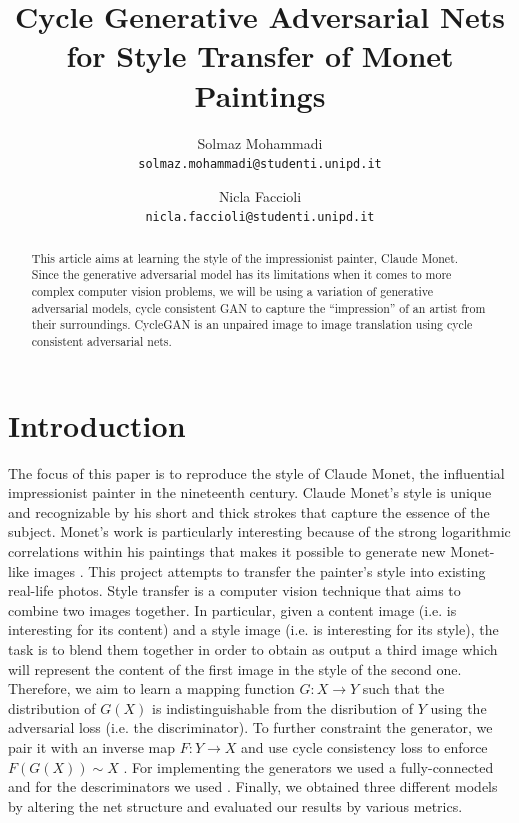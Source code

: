 \documentclass[10pt,twocolumn,letterpaper]{article}
\begin{document}
\title{Cycle Generative Adversarial Nets for Style Transfer of Monet Paintings}

\author{Solmaz Mohammadi\\
{\tt\small solmaz.mohammadi@studenti.unipd.it}
\and
Nicla Faccioli\\
{\tt\small nicla.faccioli@studenti.unipd.it}
}

\maketitle

\begin{abstract}
This article aims at learning the style of the impressionist
painter, Claude Monet. Since the generative adversarial
model has its limitations when it comes to more complex
computer vision problems, we will be using a variation
of generative adversarial models, cycle consistent GAN to capture the
“impression” of an artist from their surroundings. CycleGAN is an unpaired image to image translation using cycle consistent adversarial nets.
\end{abstract}

\section{Introduction}
The focus of this paper is to reproduce the style of Claude Monet, the
influential impressionist painter in the nineteenth century. Claude Monet’s style is unique and recognizable by his short and thick strokes that capture the essence of the subject. Monet’s work is particularly interesting because of the strong logarithmic correlations within his paintings that makes it possible to generate new Monet-like images \cite{monetlog}.
This project attempts to transfer the painter's style into existing real-life photos. Style transfer is a computer vision technique that aims to combine two images together. In particular, given a content image (i.e. is interesting for its content) and a style image (i.e. is interesting for its style), the task is to blend them together in order to obtain as output a third image which will represent the content of the first image in the style of the second one. Therefore, we aim to learn a mapping function $G: X\longrightarrow Y$ such that the distribution of $G(X)$ is indistinguishable from the disribution of $Y$ using the adversarial loss (i.e. the discriminator). To further constraint the generator, we pair it with an inverse map $F:Y \longrightarrow X$ and use cycle consistency loss to enforce $F(G(X))\sim X$ \cite{cyclegan}. For implementing the generators we used a fully-connected  and for the descriminators we used . Finally, we obtained three different models by altering the net structure and evaluated our results by various metrics.
\end{document}
